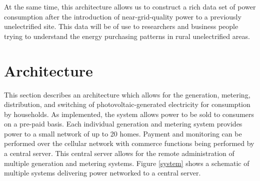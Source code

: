 \documentclass{sig-alternate}
\begin{document}
At the same time, this architecture allows us to construct
a rich data set of
power consumption after the introduction of near-grid-quality
power to a previously unelectrified site.
This data will be of use to researchers and business people
trying to understand the energy purchasing patterns in rural
unelectrified areas.


\section{Architecture}

This section describes an architecture which allows for the generation,
metering, distribution, and switching of photovoltaic-generated electricity for
consumption by households.
As implemented, the system allows power to be sold to consumers on a
pre-paid basis.
Each individual generation and metering system provides power to a small
network of up to 20 homes.
Payment and monitoring can be performed over the cellular network with commerce
functions being performed by a central server.
This central server allows for the remote administration of multiple generation
and metering systems.
Figure \ref{system} shows a schematic of multiple systems delivering power
networked to a central server.
\end{document}
